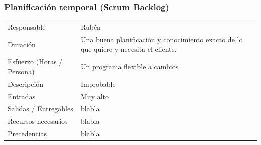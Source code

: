 \subsubsection{Planificaci\'{o}n temporal (Scrum Backlog)}
\begin{table}[H]
    \begin{center}
        \begin{tabular}{l p{8cm}}
            Responsable                           & Rub\'{e}n \\
            Duraci\'{o}n                          & Una buena planificación y conocimiento exacto de lo que quiere y necesita el cliente. \\ 
            Esfuerzo (Horas / Persona)            & Un programa flexible a cambios \\
            Descripci\'{o}n                       & Improbable \\
            Entradas                              & Muy alto\\
            Salidas / Entregables                 & blabla \\
            Recursos necesarios                   & blabla \\
            Precedencias                          & blabla \\
        \end{tabular}
    \end{center}
    
\end{table}


